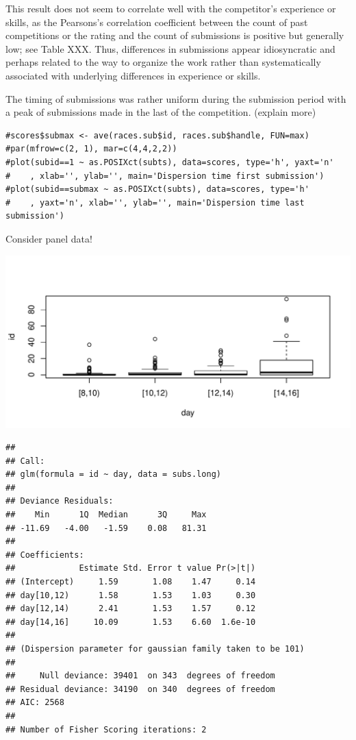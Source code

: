 \documentclass[12pt,]{article}
\begin{document}
This result does not seem to correlate well with the competitor's
experience or skills, as the Pearsons's correlation coefficient between
the count of past competitions or the rating and the count of
submissions is positive but generally low; see Table XXX. Thus,
differences in submissions appear idiosyncratic and perhaps related to
the way to organize the work rather than systematically associated with
underlying differences in experience or skills.

The timing of submissions was rather uniform during the submission
period with a peak of submissions made in the last of the competition.
(explain more)

\begin{verbatim}
#scores$submax <- ave(races.sub$id, races.sub$handle, FUN=max)
#par(mfrow=c(2, 1), mar=c(4,4,2,2))
#plot(subid==1 ~ as.POSIXct(subts), data=scores, type='h', yaxt='n'
#    , xlab='', ylab='', main='Dispersion time first submission')
#plot(subid==submax ~ as.POSIXct(subts), data=scores, type='h'
#    , yaxt='n', xlab='', ylab='', main='Dispersion time last submission')
\end{verbatim}

Consider panel data!

\includegraphics{Figures/unnamed-chunk-18-1.pdf}

\begin{verbatim}
## 
## Call:
## glm(formula = id ~ day, data = subs.long)
## 
## Deviance Residuals: 
##    Min      1Q  Median      3Q     Max  
## -11.69   -4.00   -1.59    0.08   81.31  
## 
## Coefficients:
##             Estimate Std. Error t value Pr(>|t|)
## (Intercept)     1.59       1.08    1.47     0.14
## day[10,12)      1.58       1.53    1.03     0.30
## day[12,14)      2.41       1.53    1.57     0.12
## day[14,16]     10.09       1.53    6.60  1.6e-10
## 
## (Dispersion parameter for gaussian family taken to be 101)
## 
##     Null deviance: 39401  on 343  degrees of freedom
## Residual deviance: 34190  on 340  degrees of freedom
## AIC: 2568
## 
## Number of Fisher Scoring iterations: 2
\end{verbatim}
\end{document}
